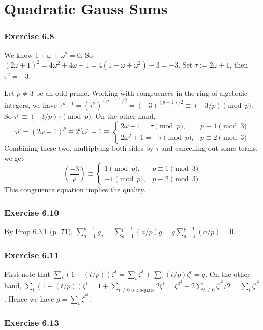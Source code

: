 \documentclass[../Chapter.tex]{subfiles}
\begin{document}
\chapter{Quadratic Gauss Sums}

\subsection*{Exercise 6.8}

We know $1+\omega+\omega^2=0$. So $(2\omega+1)^2=4\omega^2+4\omega+1=4(1+\omega+\omega^2)-3=-3$. Set $\tau:=2\omega+1$, then $\tau^2=-3$.

Let $p\neq 3$ be an odd prime. Working with congruences in the ring of algebraic integers, we have $\tau^{p-1}=(\tau^2)^{(p-1)/2}=(-3)^{(p-1)/2}\equiv (-3/p) \pmod{p}$. So $\tau^p\equiv (-3/p)\tau \pmod{p}$. On the other hand,
$$\tau^p = (2\omega+1)^p \equiv 2^p\omega^p+1 \equiv
\begin{cases}
2\omega+1 = \tau \pmod{p}, & p\equiv 1\pmod{3} \\
2\omega^2+1 = -\tau \pmod{p}, & p\equiv 2\pmod{3}
\end{cases}$$
Combining these two, multiplying both sides by $\tau$ and cancelling out some terms, we get $$\left(\dfrac{-3}{p}\right) \equiv
\begin{cases}
1 \pmod{p}, & p\equiv 1\pmod{3} \\
-1 \pmod{p}, & p\equiv 2\pmod{3}
\end{cases}$$
This congruence equation implies the quality.

\subsection*{Exercise 6.10}

By Prop 6.3.1 (p. 71), $\sum_{a=1}^{p-1} g_a = \sum_{a=1}^{p-1} (a/p)g = g\sum_{a=1}^{p-1} (a/p)=0$.

\subsection*{Exercise 6.11}

First note that $\sum_t (1+(t/p))\zeta^t = \sum_t \zeta^t + \sum_t (t/p)\zeta^t =g$. On the other hand, $\sum_t (1+(t/p))\zeta^t =1 + \sum_{t\neq 0 \text{ is a square}} 2\zeta^t = \zeta^{0^2} + 2\sum_{t\neq 0}\zeta^{t^2}/2 = \sum_t \zeta^{t^2}$. Hence we have $g=\sum_t \zeta^{t^2}$.

\subsection*{Exercise 6.13}
\end{document}
